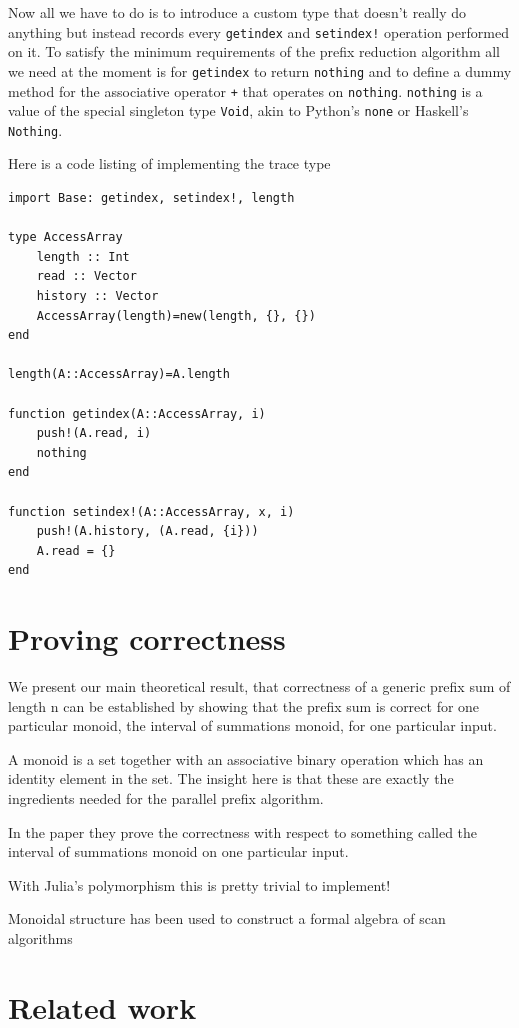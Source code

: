 \documentclass{sig-alternate}
\newcommand{\code}[1]{\texttt{#1}}
\begin{document}
Now all we have to do is to introduce a custom type that doesn't really do anything but instead records every \code{getindex} and \code{setindex!} operation performed on it. To satisfy the minimum requirements of the prefix reduction algorithm all we need at the moment is for \code{getindex} to return \code{nothing} and to define a dummy method for the associative operator \code{+} that operates on \code{nothing}. \code{nothing} is a value of the special singleton type \code{Void}, akin to Python's \code{none} or Haskell's \code{Nothing}.

Here is a code listing of implementing the trace type

\begin{verbatim}
import Base: getindex, setindex!, length

type AccessArray
    length :: Int
    read :: Vector
    history :: Vector
    AccessArray(length)=new(length, {}, {})
end

length(A::AccessArray)=A.length

function getindex(A::AccessArray, i)
    push!(A.read, i)
    nothing
end

function setindex!(A::AccessArray, x, i)
    push!(A.history, (A.read, {i}))
    A.read = {}
end
\end{verbatim}

\section{Proving correctness}

\cite{Chong2014}
We present our main theoretical result, that
correctness of a generic prefix sum of length n can be established
by showing that the prefix sum is correct for one particular monoid,
the interval of summations monoid, for one particular input.

A monoid is a set together with an associative binary operation which has an identity element in the set. The insight here is that these are exactly the ingredients needed for the parallel prefix algorithm.

In the paper they prove the correctness with respect to something called the interval of summations monoid on one particular input.

With Julia's polymorphism this is pretty trivial to implement!

Monoidal structure has been used to construct a formal algebra of scan algorithms~\cite{Hinze2004}

\section{Related work}
\end{document}
